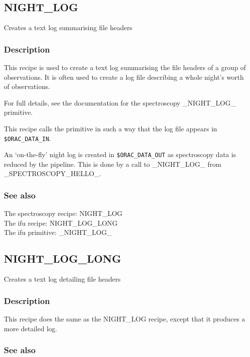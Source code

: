 \documentclass[twoside,11pt,nolof]{starlink}
\begin{document}
\subsection{NIGHT\_LOG}

Creates a text log summarising file headers

\subsubsection*{Description}

This recipe is used to create a text log summarising the file headers
of a group of observations. It is often used to create a log file
describing a whole night's worth of observations.

For full details, see the documentation for the spectroscopy
\_NIGHT\_LOG\_ primitive.



This recipe calls the primitive in such a way that the log file
appears in \texttt{\$ORAC\_DATA\_IN}.

An `on-the-fly' night log is created in \texttt{\$ORAC\_DATA\_OUT} as
spectroscopy data is reduced by the pipeline. This is done by a
call to \_NIGHT\_LOG\_ from \_SPECTROSCOPY\_HELLO\_.

\subsubsection*{See also}

The spectroscopy recipe: NIGHT\_LOG\\
The ifu recipe: NIGHT\_LOG\_LONG\\
The ifu primitive: \_NIGHT\_LOG\_


\subsection{NIGHT\_LOG\_LONG}

Creates a text log detailing file headers

\subsubsection*{Description}

This recipe does the same as the NIGHT\_LOG recipe, except that it
produces a more detailed log.

\subsubsection*{See also}
\end{document}
